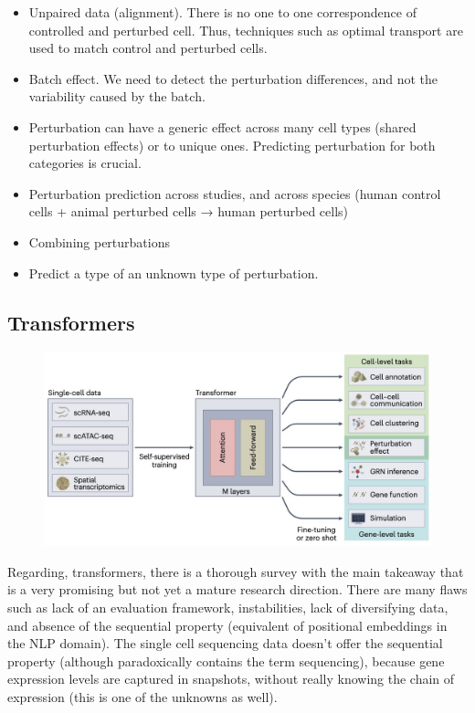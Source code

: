 \documentclass[12pt, a4paper]{article}
\begin{document}
\begin{itemize}
  \itemsep -0.1em
  \item Unpaired data (alignment). There is no one to one correspondence of controlled and perturbed cell. Thus, techniques such as optimal transport are used to match control and perturbed cells.
  \item Batch effect. We need to detect the perturbation differences, and not the variability caused by the batch.
  \item Perturbation can have a generic effect across many cell types (shared perturbation effects) or to unique ones. Predicting perturbation for both categories is crucial.
  \item Perturbation prediction across studies, and across species (human control cells + animal perturbed cells → human perturbed cells)
  \item Combining perturbations
  \item Predict a type of an unknown type of perturbation.
\end{itemize}

\clearpage

\subsection{Transformers}
\label{sec:transformers}

\begin{figure}[h!]
  \centering
  \includegraphics[width=\textwidth]{tranformers_single_cell.jpg}
  \caption{\cite{szalataTransformersSinglecellOmics2024}}
\end{figure}


Regarding, transformers, there is a thorough survey \cite{szalataTransformersSinglecellOmics2024} with the main takeaway that is a very promising but not yet a mature research direction. There are many flaws such as lack of an evaluation framework, instabilities, lack of diversifying data, and absence of the sequential property (equivalent of positional embeddings in the NLP domain). The single cell sequencing data doesn't offer the sequential property (although paradoxically contains the term sequencing),  because gene expression levels are captured in snapshots, without really knowing the chain of expression (this is one of the unknowns as well).
\end{document}
